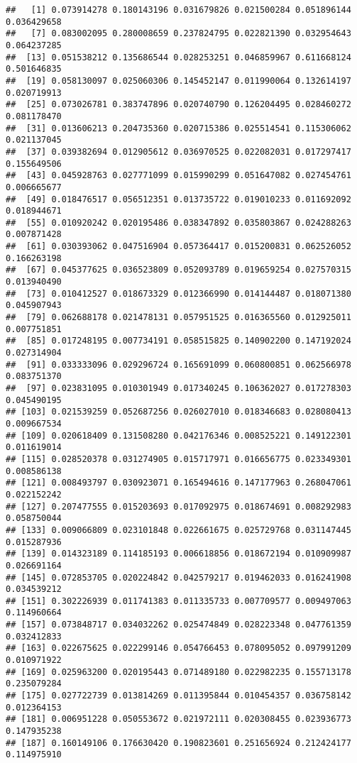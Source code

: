 \documentclass[
]{article}
\begin{document}
\begin{verbatim}
##   [1] 0.073914278 0.180143196 0.031679826 0.021500284 0.051896144 0.036429658
##   [7] 0.083002095 0.280008659 0.237824795 0.022821390 0.032954643 0.064237285
##  [13] 0.051538212 0.135686544 0.028253251 0.046859967 0.611668124 0.501646835
##  [19] 0.058130097 0.025060306 0.145452147 0.011990064 0.132614197 0.020719913
##  [25] 0.073026781 0.383747896 0.020740790 0.126204495 0.028460272 0.081178470
##  [31] 0.013606213 0.204735360 0.020715386 0.025514541 0.115306062 0.021137045
##  [37] 0.039382694 0.012905612 0.036970525 0.022082031 0.017297417 0.155649506
##  [43] 0.045928763 0.027771099 0.015990299 0.051647082 0.027454761 0.006665677
##  [49] 0.018476517 0.056512351 0.013735722 0.019010233 0.011692092 0.018944671
##  [55] 0.010920242 0.020195486 0.038347892 0.035803867 0.024288263 0.007871428
##  [61] 0.030393062 0.047516904 0.057364417 0.015200831 0.062526052 0.166263198
##  [67] 0.045377625 0.036523809 0.052093789 0.019659254 0.027570315 0.013940490
##  [73] 0.010412527 0.018673329 0.012366990 0.014144487 0.018071380 0.045907943
##  [79] 0.062688178 0.021478131 0.057951525 0.016365560 0.012925011 0.007751851
##  [85] 0.017248195 0.007734191 0.058515825 0.140902200 0.147192024 0.027314904
##  [91] 0.033333096 0.029296724 0.165691099 0.060800851 0.062566978 0.083751370
##  [97] 0.023831095 0.010301949 0.017340245 0.106362027 0.017278303 0.045490195
## [103] 0.021539259 0.052687256 0.026027010 0.018346683 0.028080413 0.009667534
## [109] 0.020618409 0.131508280 0.042176346 0.008525221 0.149122301 0.011619014
## [115] 0.028520378 0.031274905 0.015717971 0.016656775 0.023349301 0.008586138
## [121] 0.008493797 0.030923071 0.165494616 0.147177963 0.268047061 0.022152242
## [127] 0.207477555 0.015203693 0.017092975 0.018674691 0.008292983 0.058750044
## [133] 0.009066809 0.023101848 0.022661675 0.025729768 0.031147445 0.015287936
## [139] 0.014323189 0.114185193 0.006618856 0.018672194 0.010909987 0.026691164
## [145] 0.072853705 0.020224842 0.042579217 0.019462033 0.016241908 0.034539212
## [151] 0.302226939 0.011741383 0.011335733 0.007709577 0.009497063 0.114960664
## [157] 0.073848717 0.034032262 0.025474849 0.028223348 0.047761359 0.032412833
## [163] 0.022675625 0.022299146 0.054766453 0.078095052 0.097991209 0.010971922
## [169] 0.025963200 0.020195443 0.071489180 0.022982235 0.155713178 0.235079284
## [175] 0.027722739 0.013814269 0.011395844 0.010454357 0.036758142 0.012364153
## [181] 0.006951228 0.050553672 0.021972111 0.020308455 0.023936773 0.147935238
## [187] 0.160149106 0.176630420 0.190823601 0.251656924 0.212424177 0.114975910

\end{verbatim}
\end{document}
